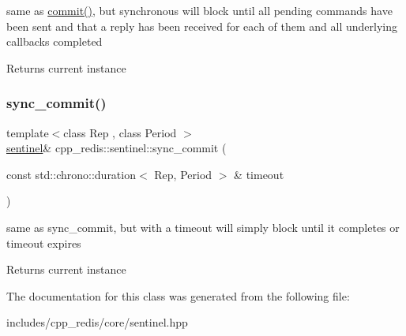 same as \hyperlink{classcpp__redis_1_1sentinel_ad4f85d486499f82225b244f85091b31e}{commit()}, but synchronous will block until all pending commands have been sent and that a reply has been received for each of them and all underlying callbacks completed

\begin{DoxyReturn}{Returns}
current instance 
\end{DoxyReturn}
\mbox{\label{classcpp__redis_1_1sentinel_afbaa0b80266f70ad98c0bf8f28c533ab}} 
\subsubsection{\texorpdfstring{sync\+\_\+commit()}{sync\_commit()}\hspace{0.1cm}{\footnotesize\ttfamily [2/2]}}
{\footnotesize\ttfamily template$<$class Rep , class Period $>$ \\
\hyperlink{classcpp__redis_1_1sentinel}{sentinel}\& cpp\+\_\+redis\+::sentinel\+::sync\+\_\+commit (\begin{DoxyParamCaption}\item[{const std\+::chrono\+::duration$<$ Rep, Period $>$ \&}]{timeout }\end{DoxyParamCaption})\hspace{0.3cm}{\ttfamily [inline]}}

same as sync\+\_\+commit, but with a timeout will simply block until it completes or timeout expires

\begin{DoxyReturn}{Returns}
current instance 
\end{DoxyReturn}


The documentation for this class was generated from the following file\+:\begin{DoxyCompactItemize}
\item 
includes/cpp\+\_\+redis/core/sentinel.\+hpp\end{DoxyCompactItemize}
